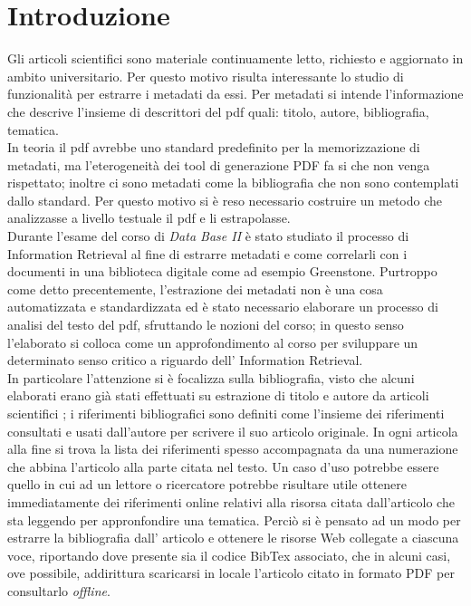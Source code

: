 \section{Introduzione}\label{intro}

Gli articoli scientifici sono materiale continuamente letto, richiesto e aggiornato in ambito universitario. Per questo motivo risulta interessante lo studio di funzionalità per estrarre i metadati da essi. Per metadati si intende l'informazione che descrive l'insieme di descrittori del pdf quali: titolo, autore, bibliografia, tematica.\\ In teoria il pdf avrebbe uno standard predefinito per la memorizzazione di metadati, ma l'eterogeneità dei tool di generazione PDF fa si che non venga rispettato; inoltre ci sono metadati come la bibliografia che non sono contemplati dallo standard. Per questo motivo si è reso necessario costruire un metodo che analizzasse a livello testuale il pdf e li estrapolasse.\\
Durante l'esame del corso di \textit{Data Base II} è stato studiato il processo di Information Retrieval al fine di estrarre metadati e come correlarli con i documenti in una biblioteca digitale come ad esempio Greenstone. Purtroppo come detto precentemente, l'estrazione dei metadati non è una cosa automatizzata e standardizzata ed è stato necessario elaborare un processo di analisi del testo del pdf, sfruttando le nozioni del corso; in questo senso l'elaborato si colloca come un approfondimento al corso per sviluppare un determinato senso critico a riguardo dell' Information Retrieval.\\
In particolare l'attenzione si è focalizza sulla bibliografia, visto che alcuni elaborati erano già stati effettuati su estrazione di titolo e autore da articoli scientifici \cite{Tarocchi}; i riferimenti bibliografici sono definiti come l'insieme dei riferimenti consultati e usati dall'autore per scrivere il suo articolo originale. In ogni articola alla fine si trova la lista dei riferimenti spesso accompagnata da una numerazione che abbina l'articolo alla parte citata nel testo. Un caso d'uso potrebbe essere quello in cui ad un lettore o ricercatore potrebbe risultare utile ottenere immediatamente dei riferimenti online relativi alla risorsa citata dall'articolo che sta leggendo per appronfondire una tematica. Perciò si è pensato ad un modo per estrarre la bibliografia dall' articolo e ottenere le risorse Web collegate a ciascuna voce, riportando dove presente sia il codice BibTex associato, che in alcuni casi, ove possibile, addirittura scaricarsi in locale l'articolo citato in formato PDF per consultarlo \textit{offline}.

